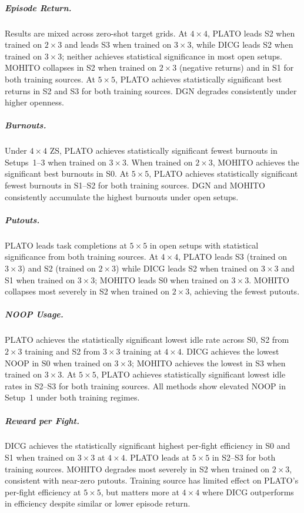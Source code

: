 \subparagraph{Episode Return.}
Results are mixed across zero-shot target grids. At $4\times 4$, PLATO leads S2 when trained on $2\times 3$ and leads S3 when trained on $3\times 3$, while DICG leads S2 when trained on $3\times 3$; neither achieves statistical significance in most open setups. MOHITO collapses in S2 when trained on $2\times 3$ (negative returns) and in S1 for both training sources. At $5\times 5$, PLATO achieves statistically significant best returns in S2 and S3 for both training sources. DGN degrades consistently under higher openness.

\subparagraph{Burnouts.}
Under $4\times 4$ ZS, PLATO achieves statistically significant fewest burnouts in Setups~1--3 when trained on $3\times 3$. When trained on $2\times 3$, MOHITO achieves the significant best burnouts in S0. At $5\times 5$, PLATO achieves statistically significant fewest burnouts in S1--S2 for both training sources. DGN and MOHITO consistently accumulate the highest burnouts under open setups.

\subparagraph{Putouts.}
PLATO leads task completions at $5\times 5$ in open setups with statistical significance from both training sources. At $4\times 4$, PLATO leads S3 (trained on $3\times 3$) and S2 (trained on $2\times 3$) while DICG leads S2 when trained on $3\times 3$ and S1 when trained on $3\times 3$; MOHITO leads S0 when trained on $3\times 3$. MOHITO collapses most severely in S2 when trained on $2\times 3$, achieving the fewest putouts.

\subparagraph{NOOP Usage.}
PLATO achieves the statistically significant lowest idle rate across S0, S2 from $2\times 3$ training and S2 from $3\times 3$ training at $4\times 4$. DICG achieves the lowest NOOP in S0 when trained on $3\times 3$; MOHITO achieves the lowest in S3 when trained on $3\times 3$. At $5\times 5$, PLATO achieves statistically significant lowest idle rates in S2--S3 for both training sources. All methods show elevated NOOP in Setup~1 under both training regimes.

\subparagraph{Reward per Fight.}
DICG achieves the statistically significant highest per-fight efficiency in S0 and S1 when trained on $3\times 3$ at $4\times 4$. PLATO leads at $5\times 5$ in S2--S3 for both training sources. MOHITO degrades most severely in S2 when trained on $2\times 3$, consistent with near-zero putouts. Training source has limited effect on PLATO's per-fight efficiency at $5\times 5$, but matters more at $4\times 4$ where DICG outperforms in efficiency despite similar or lower episode return.

